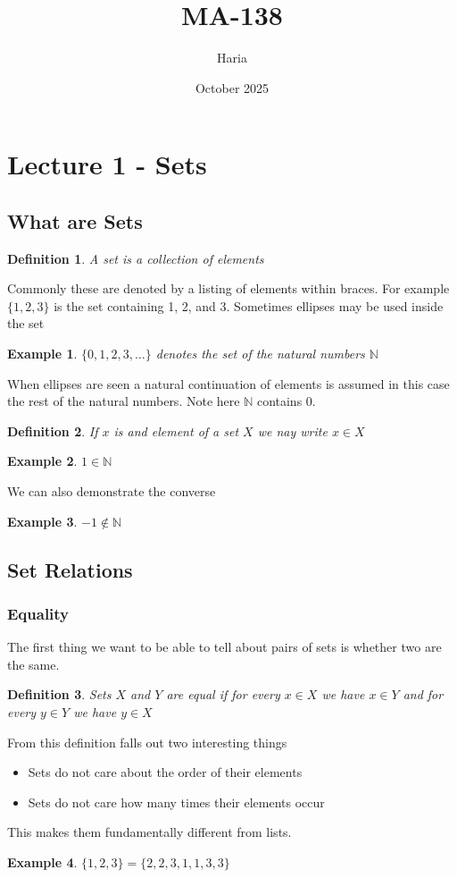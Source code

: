 \documentclass{article}
\title{MA-138}
\author{Haria}
\date{October 2025}
\begin{document}
\maketitle

\section{Lecture 1 - Sets}
\newtheorem{definition}{Definition}
\newtheorem{proposition}{Proposition}
\newtheorem*{theorem}{Theorem}
\newtheorem{example}{Example}
\subsection{What are Sets}
\begin{definition}
A set is a collection of elements
\end{definition}
Commonly these are denoted by a listing of elements within braces. For example $\{1,2,3\}$ is the set containing 1, 2, and 3. Sometimes ellipses may be used inside the set
\begin{example}
    $\{0,1,2,3,\dots\}$ denotes the set of the natural numbers $\mathbb{N}$
\end{example}
When ellipses are seen a natural continuation of elements is assumed in this case the rest of the natural numbers. Note here $\mathbb{N}$ contains $0$.

\begin{definition}
    If $x$ is and element of a set $X$ we nay write $x \in X$
\end{definition}
\begin{example}
    $1 \in \mathbb{N}$
\end{example}
We can also demonstrate the converse
\begin{example}
    $-1 \notin \mathbb{N}$
\end{example}
\subsection{Set Relations}
\subsubsection{Equality}
The first thing we want to be able to tell about pairs of sets is whether two are the same.
\begin{definition}
    Sets $X$ and $Y$ are equal if for every $x \in X$ we have $x \in Y$ and for every $y \in Y$ we have $y \in X$
\end{definition}
From this definition falls out two interesting things
\begin{itemize}
    \item Sets do not care about the order of their elements
    \item Sets do not care how many times their elements occur
\end{itemize}
This makes them fundamentally different from lists.
\begin{example}
    $\{1,2,3\} = \{2,2,3,1,1,3,3\}$
\end{example}
\end{document}
